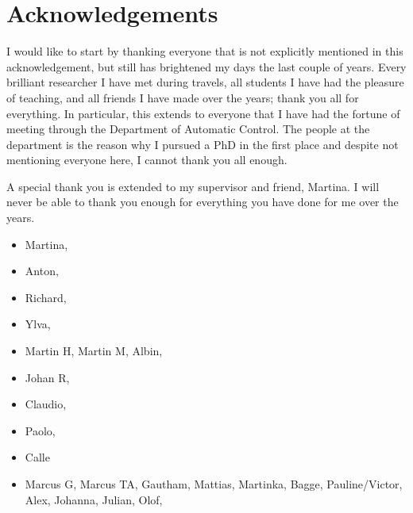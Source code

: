 \chapter*{Acknowledgements}
I would like to start by thanking everyone that is not explicitly mentioned in this acknowledgement, but still has brightened my days the last couple of years.
Every brilliant researcher I have met during travels, all students I have had the pleasure of teaching, and all friends I have made over the years; thank you all for everything.
In particular, this extends to everyone that I have had the fortune of meeting through the Department of Automatic Control.
The people at the department is the reason why I pursued a PhD in the first place and despite not mentioning everyone here, I cannot thank you all enough.

A special thank you is extended to my supervisor and friend, Martina.
I will never be able to thank you enough for everything you have done for me over the years.

\begin{itemize}
    \item Martina,
    \item Anton,
    \item Richard,
    \item Ylva,
    \item Martin H, Martin M, Albin,
    \item Johan R,
    \item Claudio,
    \item Paolo, 
    \item Calle
    \item Marcus G, Marcus TA, Gautham, Mattias, Martinka, Bagge, Pauline/Victor, Alex, Johanna, Julian, Olof,
\end{itemize}
